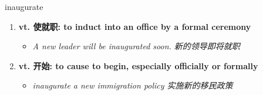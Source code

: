 
\begin{frame}
{\huge inaugurate}
\begin{center}
\begin{enumerate}\Large
  \item \textbf{vt. 使就职: to induct into an office by a formal ceremony}
  \begin{itemize}
    \item \em{\Large{A new leader will be inaugurated soon. 新的领导即将就职}}
  \end{itemize}
  \item \textbf{vt. 开始: to cause to begin, especially officially or formally}
  \begin{itemize}
    \item \em{\Large{inaugurate a new immigration policy 实施新的移民政策}}
  \end{itemize}
\end{enumerate}
\end{center}
\end{frame}
